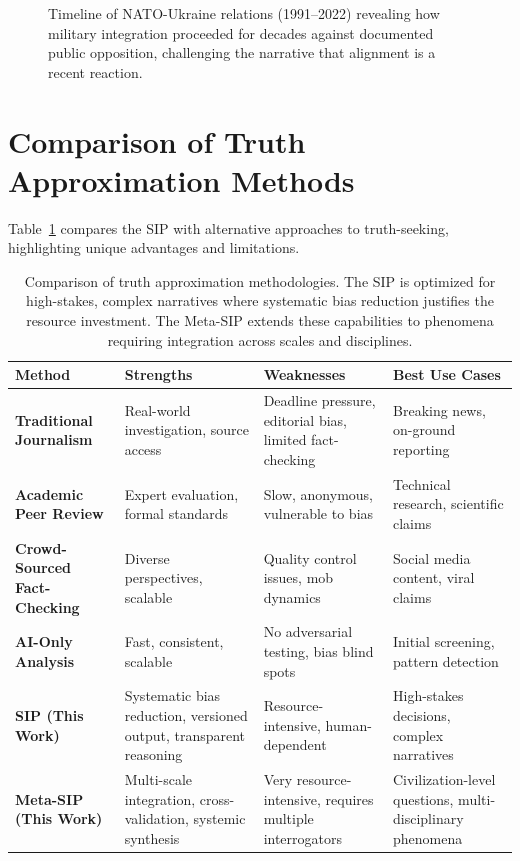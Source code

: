 \documentclass[11pt,a4paper]{article}
\begin{document}
\begin{figure}[ht]
\caption{Timeline of NATO-Ukraine relations (1991--2022) revealing how military integration proceeded for decades against documented public opposition, challenging the narrative that alignment is a recent reaction.}
\label{fig:timeline}
\end{figure}

\section{Comparison of Truth Approximation Methods}
\label{app:method_comparison}

Table~\ref{tab:methods} compares the SIP with alternative approaches to truth-seeking, highlighting unique advantages and limitations.

\begin{table}[ht]
\centering
\small
\begin{tabular}{@{}p{3cm}p{3.5cm}p{3.5cm}p{3cm}@{}}
\toprule
\textbf{Method} & \textbf{Strengths} & \textbf{Weaknesses} & \textbf{Best Use Cases} \\
\midrule
\textbf{Traditional Journalism} & Real-world investigation, source access & Deadline pressure, editorial bias, limited fact-checking & Breaking news, on-ground reporting \\
\addlinespace
\textbf{Academic Peer Review} & Expert evaluation, formal standards & Slow, anonymous, vulnerable to bias & Technical research, scientific claims \\
\addlinespace
\textbf{Crowd-Sourced Fact-Checking} & Diverse perspectives, scalable & Quality control issues, mob dynamics & Social media content, viral claims \\
\addlinespace
\textbf{AI-Only Analysis} & Fast, consistent, scalable & No adversarial testing, bias blind spots & Initial screening, pattern detection \\
\addlinespace
\textbf{SIP (This Work)} & Systematic bias reduction, versioned output, transparent reasoning & Resource-intensive, human-dependent & High-stakes decisions, complex narratives \\
\addlinespace
\textbf{Meta-SIP (This Work)} & Multi-scale integration, cross-validation, systemic synthesis & Very resource-intensive, requires multiple interrogators & Civilization-level questions, multi-disciplinary phenomena \\
\bottomrule
\end{tabular}
\caption{Comparison of truth approximation methodologies. The SIP is optimized for high-stakes, complex narratives where systematic bias reduction justifies the resource investment. The Meta-SIP extends these capabilities to phenomena requiring integration across scales and disciplines.}
\label{tab:methods}
\end{table}
\end{document}
